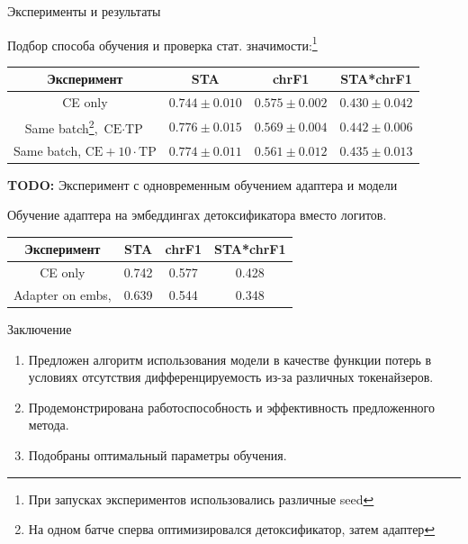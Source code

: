\documentclass[12pt, fleqn, xcolor=x11names, xcolor=table, aspectratio=169]{beamer}
\begin{document}

\begin{frame}{Эксперименты и результаты}

Подбор способа обучения и проверка стат. значимости:\footnote{При запусках экспериментов использовались различные seed}
\begin{table}[ht]
\centering
 \begin{tabular}{|c|c c c|} 
 \hline
 Эксперимент & STA & chrF1 & STA*chrF1 \\ [0.5ex] 
 \hline
 CE only & $0.744 \pm 0.010$ & $0.575 \pm 0.002$ & $0.430 \pm 0.042$ \\ 
 Same batch\footnote{На одном батче сперва оптимизировался детоксификатор, затем адаптер}, $\text{CE} \cdot \text{TP}$ & $0.776 \pm 0.015$ & $0.569 \pm 0.004$ & $0.442 \pm 0.006$ \\
 Same batch, $\text{CE} + 10 \cdot \text{TP}$ & $0.774 \pm 0.011$ & $0.561 \pm 0.012$ & $0.435 \pm 0.013$ \\

  \hline
 \end{tabular}
\end{table}

\textbf{TODO:} Эксперимент с одновременным обучением адаптера и модели

Обучение адаптера на эмбеддингах детоксификатора вместо логитов. 
\begin{table}[ht]
\centering
 \begin{tabular}{|c|c c c|} 
 \hline
 Эксперимент & STA & chrF1 & STA*chrF1 \\ [0.5ex] 
 \hline
 CE only & 0.742 & 0.577 & 0.428  \\ 
 Adapter on embs, & 0.639 & 0.544 & 0.348 \\

  \hline
 \end{tabular}
\end{table}

\end{frame}


\begin{frame}{Заключение}
    \begin{enumerate}
        \item Предложен алгоритм использования модели в качестве функции потерь в условиях отсутствия дифференцируемость из-за различных токенайзеров.
        
        \item Продемонстрирована работоспособность и эффективность предложенного метода.  
        
        \item Подобраны оптимальный параметры обучения. 
    \end{enumerate}
\end{frame}

\end{document}
